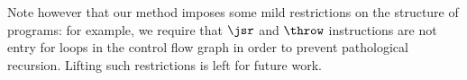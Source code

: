 Note however that our method imposes some mild restrictions on the
structure of programs: for example, we require that $\jsr$ and $\throw$ instructions
are not entry for loops in the control flow graph in order to prevent pathological recursion.
Lifting such restrictions is left for future work.




%

%

%
